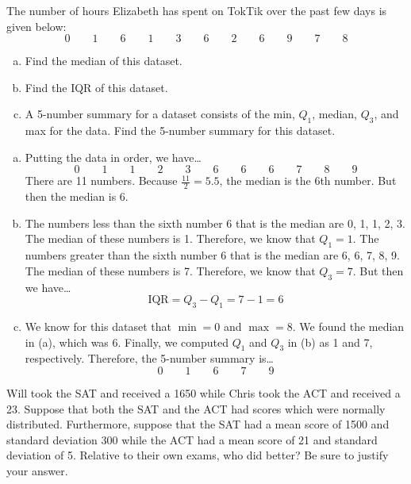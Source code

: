 \documentclass[11pt,letterpaper]{article}
\begin{document}

 The number of hours Elizabeth has spent on TokTik over the past few days is given below:
	\[
	0 \qquad 1 \qquad 6 \qquad 1 \qquad 3 \qquad 6 \qquad 2 \qquad 6 \qquad 9 \qquad 7 \qquad 8  
	\] 

\begin{enumerate}[(a)]
\item Find the median of this dataset.
\item Find the IQR of this dataset. 
\item A 5-number summary for a dataset consists of the min, $Q_1$, median, $Q_3$, and max for the data. Find the 5-number summary for this dataset. 
\end{enumerate} \pspace

\sol 
\begin{enumerate}[(a)]
\item Putting the data in order, we have\dots
	\[
	0 \qquad 1 \qquad 1 \qquad 2 \qquad 3 \qquad 6 \qquad 6 \qquad 6 \qquad 7 \qquad 8 \qquad 9 
	\]
There are 11 numbers. Because $\frac{11}{2}= 5.5$, the median is the 6th number. But then the median is 6. \pspace

\item The numbers less than the sixth number 6 that is the median are 0, 1, 1, 2, 3. The median of these numbers is 1. Therefore, we know that $Q_1= 1$. The numbers greater than the sixth number 6 that is the median are 6, 6, 7, 8, 9. The median of these numbers is 7. Therefore, we know that $Q_3= 7$. But then we have\dots
	\[
	\text{IQR}= Q_3 - Q_1= 7 - 1= 6
	\] \pspace

\item We know for this dataset that $\min= 0$ and $\max= 8$. We found the median in (a), which was 6. Finally, we computed $Q_1$ and $Q_3$ in (b) as 1 and 7, respectively. Therefore, the 5-number summary is\dots
	\[
	0 \qquad 1 \qquad 6 \qquad 7 \qquad 9 
	\]
\end{enumerate}



\newpage



 Will took the SAT and received a 1650 while Chris took the ACT and received a 23. Suppose that both the SAT and the ACT had scores which were normally distributed. Furthermore, suppose that the SAT had a mean score of 1500 and standard deviation 300 while the ACT had a mean score of 21 and standard deviation of 5. Relative to their own exams, who did better? Be sure to justify your answer. \pspace
\end{document}
